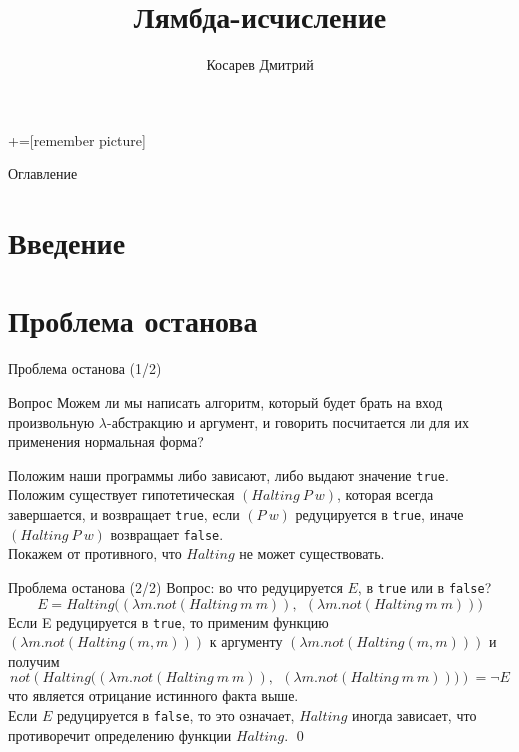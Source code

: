 \documentclass[aspectratio=169
  , xcolor={svgnames}
  , hyperref=
      { colorlinks
      , urlcolor=DarkBlue
      }
  , russian  %
  ]{beamer}
\title[]{Лямбда-исчисление}
\author{Косарев Дмитрий}
\newcommand{\abs}[2]{\ensuremath{(\lambda #1 . #2)}}
\newcommand{\lam}[2]{\ensuremath{\abs{#1}{#2}}}
\begin{document}
\maketitle

+=[remember picture]

\everymath{\displaystyle}

\begin{frame}{Оглавление}
  \tableofcontents
\end{frame}


\section*{Введение}





\section{Проблема останова}


\begin{frame}{Проблема останова (1/2)}
  \begin{block}{Вопрос}
    Можем ли мы написать алгоритм, который будет брать на вход произвольную $\lambda$-абстракцию и аргумент, и говорить посчитается ли для их применения нормальная форма?\\
  \end{block}
  \pause
  Положим наши программы либо зависают, либо выдают значение \texttt{true}.\\

  Положим существует гипотетическая $(Halting\ P\ w)$, которая всегда завершается, и возвращает \texttt{true}, если $(P\ w)$ редуцируется в \texttt{true}, иначе $(Halting\ P\ w)$ возвращает \texttt{false}.\\

  Покажем от противного, что $Halting$ не может существовать.
\end{frame}

\begin{frame}{Проблема останова (2/2)}
  Вопрос: во что редуцируется $E$, в \texttt{true} или в \texttt{false}?
  \[
  E = Halting\big( \lam{m}{not(Halting\ m\ m)},\ \ \lam{m}{not(Halting \ m\ m)} \big)
  \]
  Если E редуцируется в \texttt{true}, то применим функцию $\lam{m}{not(Halting(m,m))}$ к аргументу $\lam{m}{not(Halting(m,m))}$ и получим
  \[
  not ( Halting\big(\lam{m}{not(Halting \ m\ m)},\ \ \lam{m}{not(Halting \ m\ m)}\big)) = \neg E
  \]
  что является отрицание истинного факта выше.\\

  Если $E$ редуцируется в \texttt{false}, то это означает, $Halting$ иногда зависает, что противоречит определению функции $Halting$.
  \qed
\end{frame}
\end{document}
